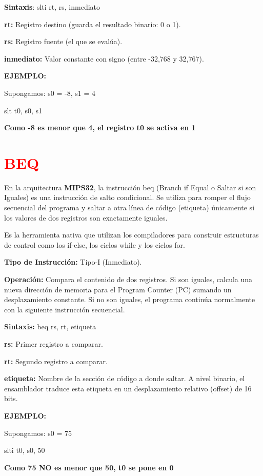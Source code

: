 \documentclass[12pt,a4paper]{article}
\begin{document}
\textbf{Sintaxis}: slti rt, rs, inmediato

\textbf{rt:} Registro destino (guarda el resultado binario: 0 o 1).

\textbf{rs:} Registro fuente (el que se evalúa).

\textbf{inmediato:} Valor constante con signo (entre -32,768 y 32,767).

\textbf{EJEMPLO:}

Supongamos: s0 = -8, s1 = 4

slt t0, s0, s1

\textbf{Como -8 es menor que  4, el registro t0 se activa en 1}


\section{\textcolor{red}{BEQ}}
En la arquitectura \textbf{MIPS32}, la instrucción beq (Branch if Equal o Saltar si son Iguales) es una instrucción de salto condicional. Se utiliza para romper el flujo secuencial del programa y saltar a otra línea de código (etiqueta) únicamente si los valores de dos registros son exactamente iguales.

Es la herramienta nativa que utilizan los compiladores para construir estructuras de control como los if-else, los ciclos while y los ciclos for.

\textbf{Tipo de Instrucción:} Tipo-I (Inmediato).

\textbf{Operación:} Compara el contenido de dos registros. Si son iguales, calcula una nueva dirección de memoria para el Program Counter (PC) sumando un desplazamiento constante. Si no son iguales, el programa continúa normalmente con la siguiente instrucción secuencial.

\textbf{Sintaxis:} beq rs, rt, etiqueta

\textbf{rs:} Primer registro a comparar.

\textbf{rt:} Segundo registro a comparar.

\textbf{etiqueta:} Nombre de la sección de código a donde saltar. A nivel binario, el ensamblador traduce esta etiqueta en un desplazamiento relativo (offset) de 16 bits.

\textbf{EJEMPLO:}

Supongamos: s0 = 75

slti t0, s0, 50 

\textbf{Como 75 NO es menor que 50, t0 se pone en 0}

\end{document}
